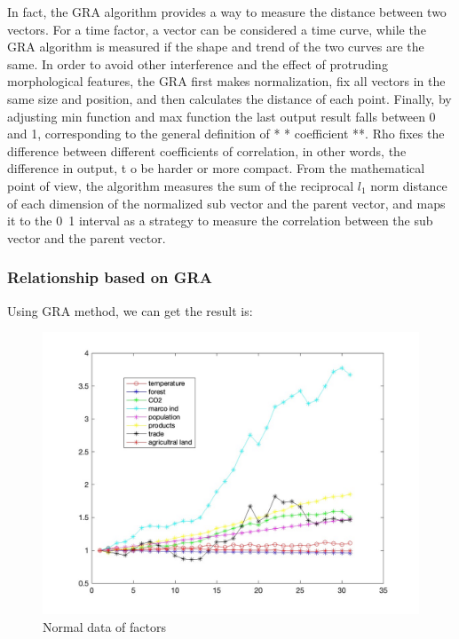 \documentclass{apmcmthesis}
\begin{document}
  In fact, the GRA algorithm provides a way to measure the distance between two vectors. 
  For a time factor, a vector can be considered a time curve, while the GRA algorithm is measured if the shape and trend of the two curves are the same. 
  In order to avoid other interference and the effect of protruding morphological features, the GRA first makes normalization, 
  fix all vectors in the same size and position, and then calculates the distance of each point. 
  Finally, by adjusting min function and max function the last output result falls between 0 and 1, corresponding to the general definition of * * coefficient **. 
  Rho fixes the difference between different coefficients of correlation, in other words, the difference in output, t o be harder or more compact. 
  From the mathematical point of view, the algorithm measures the sum of the reciprocal $l_1$ norm distance of each dimension of the normalized sub vector and the parent vector, 
  and maps it to the 0~1 interval as a strategy to measure the correlation between the sub vector and the parent vector.
  
  \subsubsection{Relationship based on GRA}
  Using GRA method, we can get the result is:
  \begin{figure}[htbp]
    \centering
    \includegraphics[scale=0.25]{2c1.jpg}
    \caption{Normal data of factors}
  \end{figure}
  
\end{document}
